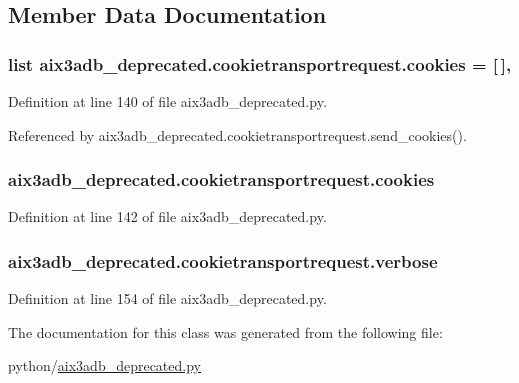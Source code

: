 \subsection{Member Data Documentation}
\subsubsection[{cookies}]{\setlength{\rightskip}{0pt plus 5cm}list aix3adb\-\_\-deprecated.\-cookietransportrequest.\-cookies = \mbox{[}$\,$\mbox{]}\hspace{0.3cm}{\ttfamily [static]}, {\ttfamily [inherited]}}\label{classaix3adb__deprecated_1_1cookietransportrequest_af3590dbaf2529939c8ee22788c807806}


Definition at line 140 of file aix3adb\-\_\-deprecated.\-py.



Referenced by aix3adb\-\_\-deprecated.\-cookietransportrequest.\-send\-\_\-cookies().

\subsubsection[{cookies}]{\setlength{\rightskip}{0pt plus 5cm}aix3adb\-\_\-deprecated.\-cookietransportrequest.\-cookies\hspace{0.3cm}{\ttfamily [inherited]}}\label{classaix3adb__deprecated_1_1cookietransportrequest_ae36266a6aa31661800c755fe26803b03}


Definition at line 142 of file aix3adb\-\_\-deprecated.\-py.

\subsubsection[{verbose}]{\setlength{\rightskip}{0pt plus 5cm}aix3adb\-\_\-deprecated.\-cookietransportrequest.\-verbose\hspace{0.3cm}{\ttfamily [inherited]}}\label{classaix3adb__deprecated_1_1cookietransportrequest_a21e8556ecdb0c551303044fe0584f296}


Definition at line 154 of file aix3adb\-\_\-deprecated.\-py.



The documentation for this class was generated from the following file\-:\begin{DoxyCompactItemize}
\item 
python/\hyperlink{aix3adb__deprecated_8py}{aix3adb\-\_\-deprecated.\-py}\end{DoxyCompactItemize}
